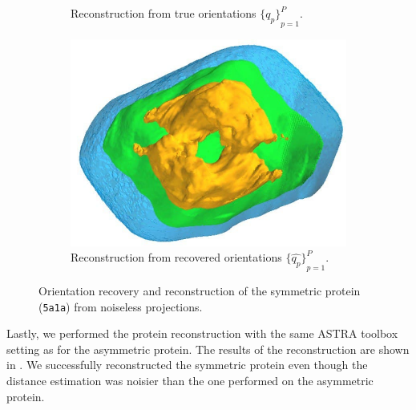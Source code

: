 \begin{figure}[ht!]
\begin{subfigure}[b]{0.25\textwidth}
        \caption{Reconstruction from true orientations ${\big\{q_p\big\}}_{p=1}^P$.}
    \end{subfigure}
    \hfill
    \begin{subfigure}[b]{0.25\textwidth}
        \centering
        \includegraphics[width=0.99\linewidth]{figures/5a1a_aligned}
        \caption{Reconstruction from recovered orientations ${\big\{\widehat{q_p}\big\}}_{p=1}^P$.}
    \end{subfigure}
    \caption{
        Orientation recovery and reconstruction of the symmetric protein (\texttt{5a1a}) from noiseless projections.
    }\label{fig:5a1a-orientation-recovery-loss}
    \label{fig:angle-alignment-5a1a-noise0}
    \label{fig:5a1a-reconstruction-noise0}
\end{figure}

Lastly, we performed the protein reconstruction with the same ASTRA toolbox setting as for the asymmetric protein. 
The results of the reconstruction are shown in .
We successfully reconstructed the symmetric protein even though the distance estimation was noisier than the one performed on the asymmetric protein.

